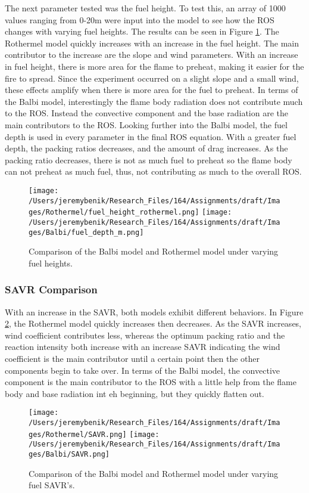 \documentclass{article}
\begin{document}
\indent The next parameter tested was the fuel height. To test this, an array of 1000 values ranging from 0-20m were input into the model to see how the ROS changes with varying fuel heights. The results can be seen in Figure \ref{fuel height}. The Rothermel model quickly increases with an increase in the fuel height. The main contributor to the increase are the slope and wind parameters. With an increase in fuel height, there is more area for the flame to preheat, making it easier for the fire to spread. Since the experiment occurred on a slight slope and a small wind, these effects amplify when there is more area for the fuel to preheat. In terms of the Balbi model, interestingly the flame body radiation does not contribute much to the ROS. Instead the convective component and the base radiation are the main contributors to the ROS. Looking further into the Balbi model, the fuel depth is used in every parameter in the final ROS equation. With a greater fuel depth, the packing ratios decreases, and the amount of drag increases. As the packing ratio decreases, there is not as much fuel to preheat so the flame body can not preheat as much fuel, thus, not contributing as much to the overall ROS.
\newpage
\begin{figure}[!h]
\centering
  \texttt{[image: /Users/jeremybenik/Research\_Files/164/Assignments/draft/Images/Rothermel/fuel\_height\_rothermel.png]}
  \texttt{[image: /Users/jeremybenik/Research\_Files/164/Assignments/draft/Images/Balbi/fuel\_depth\_m.png]}
  \caption{Comparison of the Balbi model and Rothermel model under varying fuel heights.}
  \label{fuel height}
\end{figure}
\subsubsection{SAVR Comparison}
\indent With an increase in the SAVR, both models exhibit different behaviors. In Figure \ref{SAVR}, the Rothermel model quickly increases then decreases. As the SAVR increases, wind coefficient contributes less, whereas the optimum packing ratio and the reaction intensity both increase with an increase SAVR indicating the wind coefficient is the main contributor until a certain point then the other components begin to take over. In terms of the Balbi model, the convective component is the main contributor to the ROS with a little help from the flame body and base radiation int eh beginning, but they quickly flatten out.
\newpage
\begin{figure}[!h]
\centering
  \texttt{[image: /Users/jeremybenik/Research\_Files/164/Assignments/draft/Images/Rothermel/SAVR.png]}
  \texttt{[image: /Users/jeremybenik/Research\_Files/164/Assignments/draft/Images/Balbi/SAVR.png]}
  \caption{Comparison of the Balbi model and Rothermel model under varying fuel SAVR's.}
  \label{SAVR}
\end{figure}
\end{document}

